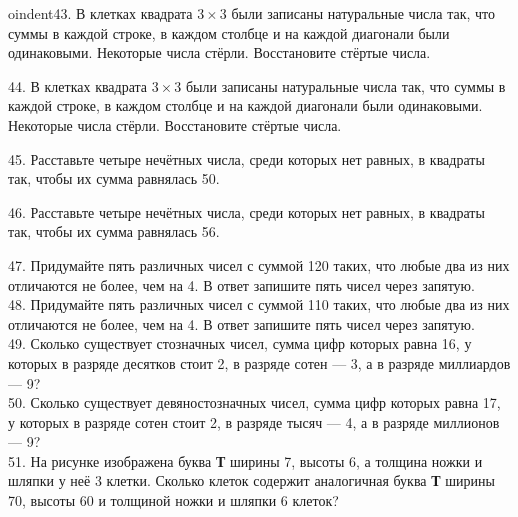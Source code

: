 oindent43. В клетках квадрата $3\times3$ были записаны натуральные числа так, что суммы в каждой строке, в каждом столбце и на каждой диагонали были одинаковыми. Некоторые числа стёрли. Восстановите стёртые числа.
\begin{center}
\begin{figure}[ht!]
\end{figure}
\end{center}
44. В клетках квадрата $3\times3$ были записаны натуральные числа так, что суммы в каждой строке, в каждом столбце и на каждой диагонали были одинаковыми. Некоторые числа стёрли. Восстановите стёртые числа.
\begin{center}
\begin{figure}[ht!]
\end{figure}
\end{center}
45. Расставьте четыре нечётных числа, среди которых нет равных, в квадраты так, чтобы их сумма равнялась 50.
\begin{center}
\begin{figure}[ht!]
\end{figure}
\end{center}
46. Расставьте четыре нечётных числа, среди которых нет равных, в квадраты так, чтобы их сумма равнялась 56.
\begin{center}
\begin{figure}[ht!]
\end{figure}
\end{center}
47. Придумайте пять различных чисел с суммой 120 таких, что любые два из них отличаются не более, чем на 4. В ответ запишите пять чисел через запятую.\\
48. Придумайте пять различных чисел с суммой 110 таких, что любые два из них отличаются не более, чем на 4. В ответ запишите пять чисел через запятую.\\
49. Сколько существует стозначных чисел, сумма цифр которых равна 16, у которых в разряде десятков стоит 2, в разряде сотен --- 3, а в разряде миллиардов --- 9?\\
50. Сколько существует девяностозначных чисел, сумма цифр которых равна 17, у которых в разряде сотен стоит 2, в разряде тысяч --- 4, а в разряде миллионов --- 9?\\
51. На рисунке изображена буква {\bf Т} ширины 7, высоты 6, а толщина ножки и шляпки у неё 3 клетки. Сколько клеток содержит аналогичная буква {\bf Т} ширины 70, высоты 60 и толщиной ножки и шляпки 6 клеток?
\begin{center}
\begin{figure}[ht!]
\end{figure}
\end{center}

